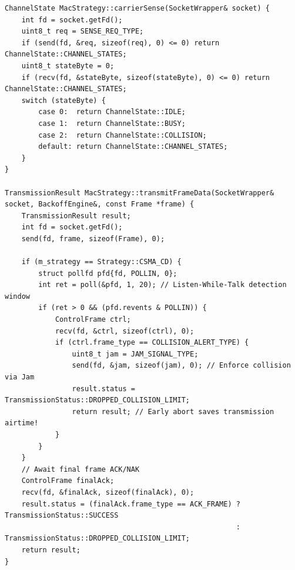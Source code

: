 \documentclass[11pt,a4paper]{article}
\begin{document}
\begin{lstlisting}[caption={Carrier Sensing \& Early Abort with Jamming in Strategy Base Class (src/classes.cpp)}]
ChannelState MacStrategy::carrierSense(SocketWrapper& socket) {
    int fd = socket.getFd();
    uint8_t req = SENSE_REQ_TYPE;
    if (send(fd, &req, sizeof(req), 0) <= 0) return ChannelState::CHANNEL_STATES;
    uint8_t stateByte = 0;
    if (recv(fd, &stateByte, sizeof(stateByte), 0) <= 0) return ChannelState::CHANNEL_STATES;
    switch (stateByte) {
        case 0:  return ChannelState::IDLE;
        case 1:  return ChannelState::BUSY;
        case 2:  return ChannelState::COLLISION;
        default: return ChannelState::CHANNEL_STATES;
    }
}

TransmissionResult MacStrategy::transmitFrameData(SocketWrapper& socket, BackoffEngine&, const Frame *frame) {
    TransmissionResult result;
    int fd = socket.getFd();
    send(fd, frame, sizeof(Frame), 0);

    if (m_strategy == Strategy::CSMA_CD) {
        struct pollfd pfd{fd, POLLIN, 0};
        int ret = poll(&pfd, 1, 20); // Listen-While-Talk detection window
        if (ret > 0 && (pfd.revents & POLLIN)) {
            ControlFrame ctrl;
            recv(fd, &ctrl, sizeof(ctrl), 0);
            if (ctrl.frame_type == COLLISION_ALERT_TYPE) {
                uint8_t jam = JAM_SIGNAL_TYPE;
                send(fd, &jam, sizeof(jam), 0); // Enforce collision via Jam
                result.status = TransmissionStatus::DROPPED_COLLISION_LIMIT;
                return result; // Early abort saves transmission airtime!
            }
        }
    }
    // Await final frame ACK/NAK
    ControlFrame finalAck;
    recv(fd, &finalAck, sizeof(finalAck), 0);
    result.status = (finalAck.frame_type == ACK_FRAME) ? TransmissionStatus::SUCCESS 
                                                       : TransmissionStatus::DROPPED_COLLISION_LIMIT;
    return result;
}
\end{lstlisting}
\end{document}
